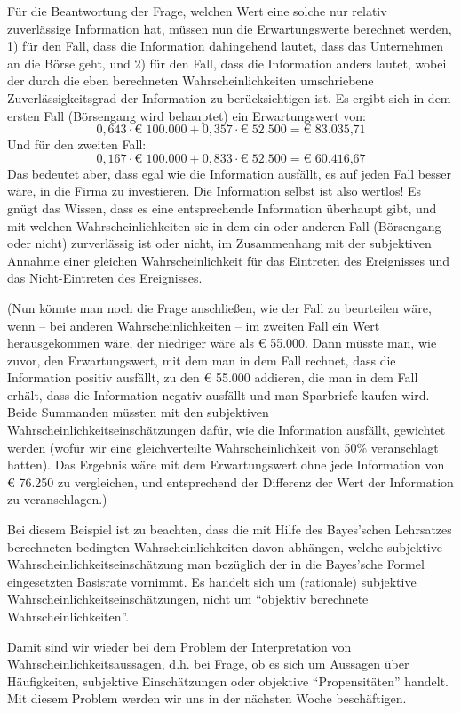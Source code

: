 Für die Beantwortung der Frage, welchen Wert eine solche nur relativ zuverlässige
Information hat, müssen nun die Erwartungswerte berechnet werden, 1) für den
Fall, dass die Information dahingehend lautet, dass das Unternehmen an die Börse
geht, und 2) für den Fall, dass die Information anders lautet, wobei der durch
die eben berechneten Wahrscheinlichkeiten umschriebene Zuverlässigkeitsgrad der
Information zu berücksichtigen ist. Es ergibt sich in dem ersten Fall (Börsengang
wird behauptet) ein Erwartungswert von: \[ 0,643\cdot \mbox{€ 100.000} +
0,357\cdot \mbox{€ 52.500} = \mbox{€ 83.035,71} \] Und für den zweiten Fall: \[
0,167\cdot \mbox{€ 100.000} + 0,833\cdot \mbox{€ 52.500} = \mbox{€ 60.416,67} \]
Das bedeutet aber, dass egal wie die Information ausfällt, es auf jeden Fall
besser wäre, in die Firma zu investieren. Die Information selbst ist also
wertlos! Es gnügt das Wissen, dass es eine entsprechende Information überhaupt
gibt, und mit welchen Wahrscheinlichkeiten sie in dem ein oder anderen Fall
(Börsengang oder nicht) zurverlässig ist oder nicht, im Zusammenhang mit der
subjektiven Annahme einer gleichen Wahrscheinlichkeit für das Eintreten des
Ereignisses und das Nicht-Eintreten des Ereignisses.

(Nun könnte man noch die Frage anschließen, wie der Fall zu beurteilen
wäre, wenn -- bei anderen Wahrscheinlichkeiten -- im zweiten Fall ein Wert
herausgekommen wäre, der niedriger wäre als € 55.000. Dann müsste man, wie zuvor,
den Erwartungswert, mit dem man in dem Fall rechnet, dass die Information positiv
ausfällt, zu den € 55.000 addieren, die man in dem Fall erhält, dass die
Information negativ ausfällt und man Sparbriefe kaufen wird. Beide Summanden
müssten mit den subjektiven Wahrscheinlichkeitseinschätzungen dafür, wie die
Information ausfällt, gewichtet werden (wofür wir eine gleichverteilte
Wahrscheinlichkeit von 50\% veranschlagt hatten). Das Ergebnis wäre mit dem
Erwartungswert ohne jede Information von € 76.250 zu vergleichen, und
entsprechend der Differenz der Wert der Information zu veranschlagen.)

Bei diesem Beispiel ist zu beachten, dass die mit Hilfe des Bayes'schen
Lehrsatzes berechneten bedingten Wahrscheinlichkeiten davon abhängen, welche
subjektive Wahrscheinlichkeitseinschätzung man bezüglich der in die Bayes'sche
Formel eingesetzten Basisrate vornimmt. Es handelt sich um (rationale)
subjektive Wahrscheinlichkeitseinschätzungen, nicht um "`objektiv berechnete
Wahrscheinlichkeiten"'.

Damit sind wir wieder bei dem Problem der Interpretation von
Wahrscheinlichkeitsaussagen, d.h. bei Frage, ob es sich um Aussagen über
Häufigkeiten, subjektive Einschätzungen oder objektive "`Propensitäten"'
handelt. Mit diesem Problem werden wir uns in der nächsten Woche beschäftigen.


